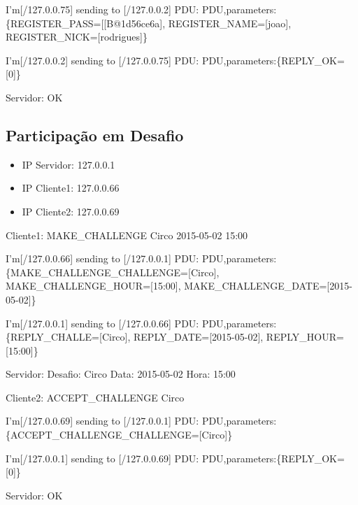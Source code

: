\documentclass[runningheads,a4paper]{llncs}
\begin{document}
I'm[/127.0.0.75] sending to [/127.0.0.2] PDU: PDU,parameters:\{REGISTER\_PASS=[[B@1d56ce6a], REGISTER\_NAME=[joao], REGISTER\_NICK=[rodrigues]\}

I'm[/127.0.0.2] sending to [/127.0.0.75] PDU: PDU,parameters:\{REPLY\_OK=[0]\}

Servidor: OK

\subsection{Participação em Desafio}

\begin{itemize}

\item IP Servidor: 127.0.0.1
\item IP Cliente1: 127.0.0.66
\item IP Cliente2: 127.0.0.69

\end{itemize}

Cliente1: MAKE\_CHALLENGE Circo 2015-05-02 15:00

I'm[/127.0.0.66] sending to [/127.0.0.1] PDU: PDU,parameters:\{MAKE\_CHALLENGE\_CHALLENGE=[Circo], MAKE\_CHALLENGE\_HOUR=[15:00], MAKE\_CHALLENGE\_DATE=[2015-05-02]\}

I'm[/127.0.0.1] sending to [/127.0.0.66] PDU: PDU,parameters:\{REPLY\_CHALLE=[Circo], REPLY\_DATE=[2015-05-02], REPLY\_HOUR=[15:00]\}

Servidor:  Desafio: Circo Data: 2015-05-02 Hora: 15:00

Cliente2: ACCEPT\_CHALLENGE Circo

I'm[/127.0.0.69] sending to [/127.0.0.1] PDU: PDU,parameters:\{ACCEPT\_CHALLENGE\_CHALLENGE=[Circo]\}

I'm[/127.0.0.1] sending to [/127.0.0.69] PDU: PDU,parameters:\{REPLY\_OK=[0]\}

Servidor: OK
\end{document}
